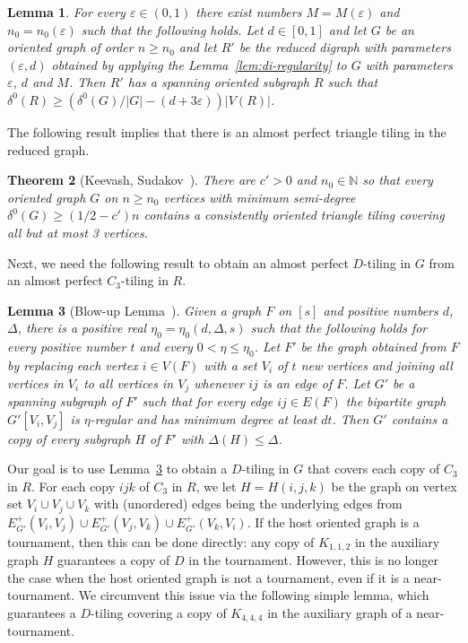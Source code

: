 \documentclass[11pt]{amsart}
\newtheorem{theorem}{Theorem}[section]
\newtheorem{lemma}[theorem]{Lemma}
\def\N{\mathbb{N}}
\newcommand{\veps}{\varepsilon}
\begin{document}
\begin{lemma}\label{lem:reduced_graph}
    For every $\veps \in (0,1)$ there exist numbers $M = M(\veps)$ and $n_0 = n_0(\veps) $ such that the following holds. Let $d \in [0, 1]$ and let $G$ be an oriented graph of order $n \ge n_0$ and let $R'$ be the reduced digraph with parameters $(\veps, d)$ obtained by applying the Lemma~\ref{lem:di-regularity} to $G$ with parameters $\veps$, $d$ and $M$. Then $R'$ has a spanning oriented subgraph $R$ such that $\delta^0(R) \ge (\delta^0(G)/|G|-(d+3\veps))|V(R)|$.
\end{lemma}

The following result implies that there is an almost perfect triangle tiling in the reduced graph.

\begin{theorem}[Keevash, Sudakov~\cite{keevash}] \label{thm:keevash}
    There are $c' > 0$ and $n_0 \in \N$ so that every oriented graph $G$ on $n\ge n_0$ vertices with minimum semi-degree $\delta^0(G) \ge (1/2 - c')n$ contains a consistently oriented triangle tiling covering all but at most 3 vertices.
\end{theorem}

Next, we need the following result to obtain an almost perfect $D$-tiling in $G$ from an almost perfect $C_3$-tiling in $R$.

\begin{lemma}[Blow-up Lemma~\cite{blowuplemma}]\label{lem:blowup}
    Given a graph $F$ on $[s]$ and positive numbers $d$, $\Delta$, there is a positive real $\eta_0 = \eta_0(d, \Delta, s)$ such that the following holds for every positive number $t$ and every $0 < \eta \le \eta_0$. Let $F'$ be the graph obtained from $F$ by replacing each vertex $i \in V(F)$ with a set $V_i$ of $t$ new vertices and joining all vertices in $V_i$ to all vertices in $V_j$ whenever $ij$ is an edge of $F$. Let $G'$ be a spanning subgraph of $F'$ such that for every edge $ij \in E(F)$ the bipartite graph $G'[V_i,V_j]$ is $\eta$-regular and has minimum degree at least $dt$. Then $G'$ contains a copy of every subgraph $H$ of $F'$ with $\Delta(H) \le \Delta$. %
\end{lemma}

Our goal is to use Lemma~\ref{lem:blowup} to obtain a $D$-tiling in $G$ that covers each copy of $C_3$ in $R$.
For each copy $ijk$ of $C_3$ in $R$, we let $H=H(i,j,k)$ be the graph on vertex set $V_i \cup V_j \cup V_k$ with (unordered) edges being the underlying edges from $E^+_{G'}(V_i, V_j) \cup E^+_{G'}(V_j, V_k) \cup E^+_{G'}(V_k, V_i)$.
If the host oriented graph is a tournament, then this can be done directly: any copy of $K_{1,1,2}$ in the auxiliary graph $H$ guarantees a copy of $D$ in the tournament. However, this is no longer the case when the host oriented graph is not a tournament, even if it is a near-tournament. We circumvent this issue via the following simple lemma, which guarantees a $D$-tiling covering a copy of $K_{4,4,4}$ in the auxiliary graph of a near-tournament.
\end{document}
